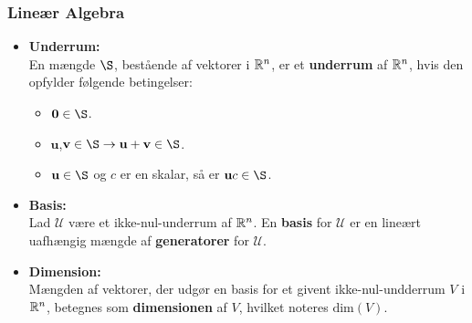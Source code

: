 %
\begin{frame}
\frametitle{Lineær Algebra}
\begin{itemize}
\item \textbf{Underrum: } \\ 
En mængde $\S$, bestående af vektorer i $\mathbb{R}^n$, er et \textbf{underrum} af $\mathbb{R}^n$, hvis den opfylder følgende betingelser:	
\begin{itemize}
\item $\textbf{0}\in \S$.
\item $\textbf{u}$,$\textbf{v} \in \S \rightarrow \textbf{u}+\textbf{v} \in \S $.
\item $\textbf{u} \in \S$ og $c$ er en skalar, så er $\textbf{u}c \in \S$.
\end{itemize}
\item \textbf{Basis: } \\ 
Lad $\mathcal{U}$ være et ikke-nul-underrum af $\mathbb{R}^n$. 
En \textbf{basis} for $\mathcal{U}$ er en lineært uafhængig mængde af \textbf{generatorer} for $\mathcal{U}$. \\ 
\item \textbf{Dimension: } \\ 
Mængden af vektorer, der udgør en basis for et givent ikke-nul-undderrum $V$ i $\mathbb{R}^n$, betegnes som \textbf{dimensionen} af $V$, hvilket noteres $\text{dim}(V)$. 
\end{itemize}
\end{frame}
%
